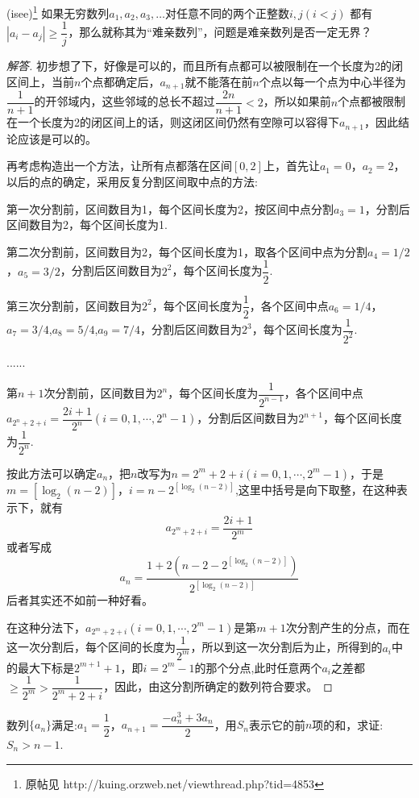 \begin{exercise}
  (isee)\footnote{原帖见 http://kuing.orzweb.net/viewthread.php?tid=4853}
  如果无穷数列$a_1,a_2,a_3,\ldots $对任意不同的两个正整数$i,j(i<j)$ 都有$|a_i-a_j| \geqslant \dfrac{1}{j}$，那么就称其为“难亲数列”，问题是难亲数列是否一定无界？
\end{exercise}

\begin{proof}[解答]
  初步想了下，好像是可以的，而且所有点都可以被限制在一个长度为2的闭区间上，当前$n$个点都确定后，$a_{n+1}$就不能落在前$n$个点以每一个点为中心半径为$\dfrac{1}{n+1}$的开邻域内，这些邻域的总长不超过$\dfrac{2n}{n+1}<2$，所以如果前$n$个点都被限制在一个长度为2的闭区间上的话，则这闭区间仍然有空隙可以容得下$a_{n+1}$，因此结论应该是可以的。

  再考虑构造出一个方法，让所有点都落在区间$[0,2]$上，首先让$a_1=0$，$a_2=2$，以后的点的确定，采用反复分割区间取中点的方法:

第一次分割前，区间数目为1，每个区间长度为2，按区间中点分割$a_3=1$，分割后区间数目为2，每个区间长度为1.

第二次分割前，区间数目为2，每个区间长度为1，取各个区间中点为分割$a_4=1/2$，$a_5=3/2$，分割后区间数目为$2^2$，每个区间长度为$\dfrac{1}{2}$.

第三次分割前，区间数目为$2^2$，每个区间长度为$\dfrac{1}{2}$，各个区间中点$a_6=1/4$，$a_7=3/4$,$a_8=5/4$,$a_9=7/4$，分割后区间数目为$2^3$，每个区间长度为$\dfrac{1}{2^2}$.

......

第$n+1$次分割前，区间数目为$2^n$，每个区间长度为$\dfrac{1}{2^{n-1}}$，各个区间中点$a_{2^n+2+i}=\dfrac{2i+1}{2^n}(i=0,1,\cdots,2^n-1)$，分割后区间数目为$2^{n+1}$，每个区间长度为$\dfrac{1}{2^n}$.

按此方法可以确定$a_n$，把$n$改写为$n=2^m+2+i(i=0,1,\cdots,2^m-1)$，于是$m=[\log_2(n-2)]$，$i=n-2^{[\log_2(n-2)]}$,这里中括号是向下取整，在这种表示下，就有
\[ a_{2^m+2+i}=\frac{2i+1}{2^m} \]
或者写成
\[ a_n=\frac{1+2(n-2-2^{[\log_2(n-2)]})}{2^{[\log_2(n-2)]}} \]
后者其实还不如前一种好看。

在这种分法下，$a_{2^m+2+i}(i=0,1,\cdots,2^m-1)$是第$m+1$次分割产生的分点，而在这一次分割后，每个区间的长度为$\dfrac{1}{2^m}$，所以到这一次分割后为止，所得到的$a_i$中的最大下标是$2^{m+1}+1$，即$i=2^m-1$的那个分点,此时任意两个$a_i$之差都$\geqslant \dfrac{1}{2^m}>\dfrac{1}{2^m+2+i}$，因此，由这分割所确定的数列符合要求。
\end{proof}

\begin{exercise}
  数列$\{a_n\}$满足:$a_1=\dfrac{1}{2}$，$a_{n+1}=\dfrac{-a_n^3+3a_n}{2}$，用$S_n$表示它的前$n$项的和，求证: $S_n>n-1$.
\end{exercise}

